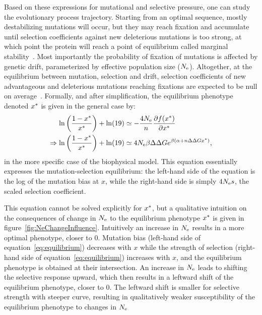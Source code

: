 Based on these expressions for mutational and selective pressure, one can study the evolutionary process trajectory.
Starting from an optimal sequence, mostly destabilizing mutations will occur, but they may reach fixation and accumulate until selection coefficients against new deleterious mutations is too strong, at which point the protein will reach a point of equilibrium called marginal stability~\citep{Taverna2002, Bloom2007}.
Most importantly the probability of fixation of mutations is affected by genetic drift, parameterized by effective population size ($N_{\mathrm{e}}$).
Altogether, at the equilibrium between mutation, selection and drift, selection coefficients of new advantageous and deleterious mutations reaching fixations are expected to be null on average~\citep{Goldstein2013}.
Formally, and after simplification, the equilibrium phenotype denoted $x^{*}$ is given in the general case by:
\begin{align}
    \ln \left( \frac{1 - x\eq}{x\eq} \right) + \ln (19) & \simeq - \frac{4\Ne}{\NbrSites} \frac{ \partial \logfit (x\eq) }{\partial {x\eq}} \\
    \Rightarrow \ln \left( \frac{1 - x\eq}{x\eq} \right) + \ln (19) & \simeq 4\Ne \beta \DeltaDeltaG e^{\beta (\DeltaGmin + \NbrSites \DeltaDeltaG x\eq)} \text{,} \label{eq:equilibrium}
\end{align}
in the more specific case of the biophysical model.
This equation essentially expresses the mutation-selection equilibrium: the left-hand side of the equation is the log of the mutation bias at $x$, while the right-hand side is simply $4 N_{\mathrm{e}} s$, the scaled selection coefficient.

This equation cannot be solved explicitly for $x^{*}$, but a qualitative intuition on the consequences of change in $N_{\mathrm{e}}$ to the equilibrium phenotype $x^{*}$ is given in figure~\ref{fig:NeChangeInfluence}.
Intuitively an increase in $N_{\mathrm{e}}$ results in a more optimal phenotype, closer to $0$.
Mutation bias (left-hand side of equation~\ref{eq:equilibrium}) decreases with $x$ while the strength of selection (right-hand side of equation~\ref{eq:equilibrium}) increases with $x$, and the equilibrium phenotype is obtained at their intersection.
An increase in $N_{\mathrm{e}}$ leads to shifting the selective response upward, which then results in a leftward shift of the equilibrium phenotype, closer to $0$.
The leftward shift is smaller for selective strength with steeper curve, resulting in qualitatively weaker susceptibility of the equilibrium phenotype to changes in $N_{\mathrm{e}}$

